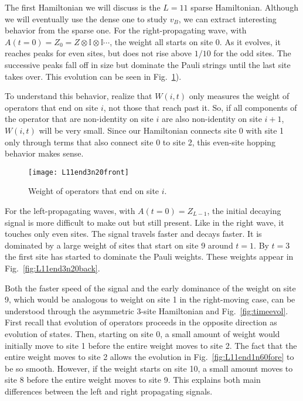 The first Hamiltonian we will discuss is the $L=11$ sparse Hamiltonian. Although we will eventually use the dense one to study $v_B$, we can extract interesting behavior from the sparse one.
For the right-propagating wave, with $A(t=0) = Z_0 = Z\otimes \mathbb{I} \otimes \mathbb{I} \cdots$, the weight all starts on site 0. As it evolves, it reaches peaks for even sites, but does not rise above $1/10$ for the odd sites. The successive peaks fall off in size but dominate the Pauli strings until the last site takes over. This evolution can be seen in Fig.~\ref{fig:L11end3n20front}). 

To understand this behavior, realize that $W(i,t)$ only measures the weight of operators that end on site $i$, not those that reach past it. So, if all components of the operator that are non-identity on site $i$ are also non-identity on site $i+1$, $W(i,t)$ will be very small. Since our Hamiltonian connects site 0 with site 1 only through terms that also connect site 0 to site 2, this even-site hopping behavior makes sense. 

\begin{figure}
	\centering
	\texttt{[image: L11end3n20front]}
	\caption{Weight of operators that end on site $i$.}
	\label{fig:L11end3n20front}
\end{figure}

For the left-propagating waves, with $A(t=0)=Z_{L-1}$, the initial decaying signal is more difficult to make out but still present. Like in the right wave, it touches only even sites. The signal travels faster and decays faster. It is dominated by a large weight of sites that start on site 9 around $t=1$. By $t = 3$ the first site has started to dominate the Pauli weights. These weights appear in Fig.~\ref{fig:L11end3n20back}.

Both the faster speed of the signal and the early dominance of the weight on site 9, which would be analogous to weight on site 1 in the right-moving case, can be understood through the asymmetric 3-site Hamiltonian and Fig.~\ref{fig:timeevol}. First recall that evolution of operators proceeds in the opposite direction as evolution of states. Then, starting on site 0, a small amount of weight would initially move to site 1 before the entire weight moves to site 2. The fact that the entire weight moves to site 2 allows the evolution in Fig.~\ref{fig:L11end1n60fore} to be so smooth. However, if the weight starts on site 10, a small amount moves to site 8 before the entire weight moves to site 9. This explains both main differences between the left and right propagating signals.


